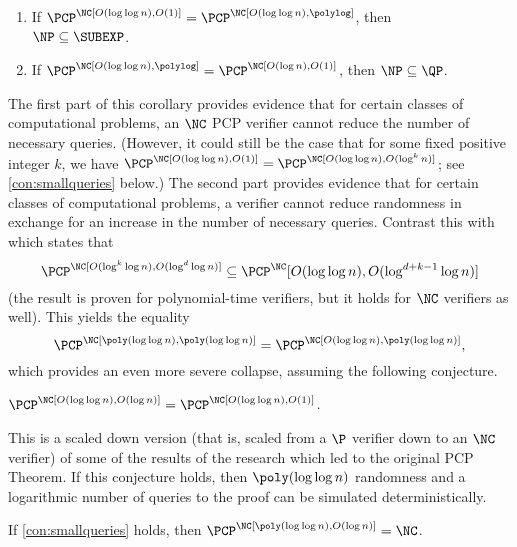 \begin{corollary}
  \mbox{}
  \begin{enumerate}
  \item If $\PCP^\NC[O(\loglog n), O(1)] = \PCP^\NC[O(\loglog n), \polylog]$, then \\ $\NP \subseteq \SUBEXP$.
  \item If $\PCP^\NC[O(\loglog n), \polylog] = \PCP^\NC[O(\log n), O(1)]$, then $\NP \subseteq \QP$.
  \end{enumerate}
\end{corollary}

The first part of this corollary provides evidence that for certain classes of computational problems, an $\NC$ PCP verifier cannot reduce the number of necessary queries.
(However, it could still be the case that for some fixed positive integer $k$, we have $\PCP^\NC[O(\loglog n), O(1)] = \PCP^\NC[O(\loglog n), O(\log^k n)]$; see \autoref{con:smallqueries} below.)
The second part provides evidence that for certain classes of computational problems, a verifier cannot reduce randomness in exchange for an increase in the number of necessary queries.
Contrast this with \autocite[Corollary~10]{fs96} which states that
\begin{equation*}
  \PCP^\NC[O(\log^k \log n), O(\log^d \log n)] \subseteq \PCP^\NC[O(\loglog n), O(\log^{d + k - 1} \log n)]
\end{equation*}
(the result is proven for polynomial-time verifiers, but it holds for $\NC$ verifiers as well).
This yields the equality
\begin{equation*}
  \PCP^\NC[\poly(\loglog n), \poly(\loglog n)] = \PCP^\NC[O(\loglog n), \poly(\loglog n)],
\end{equation*}
which provides an even more severe collapse, assuming the following conjecture.
\begin{conjecture}\label{con:smallqueries}
  $\PCP^\NC[O(\loglog n), O(\log n)] = \PCP^\NC[O(\loglog n), O(1)]$.
\end{conjecture}
This is a scaled down version (that is, scaled from a $\P$ verifier down to an $\NC$ verifier) of some of the results of the research which led to the original PCP Theorem.
If this conjecture holds, then $\poly(\loglog n)$ randomness and a logarithmic number of queries to the proof can be simulated deterministically.
\begin{theorem}
  If \autoref{con:smallqueries} holds, then $\PCP^\NC[\poly(\loglog n), O(\log n)] = \NC$.
\end{theorem}
